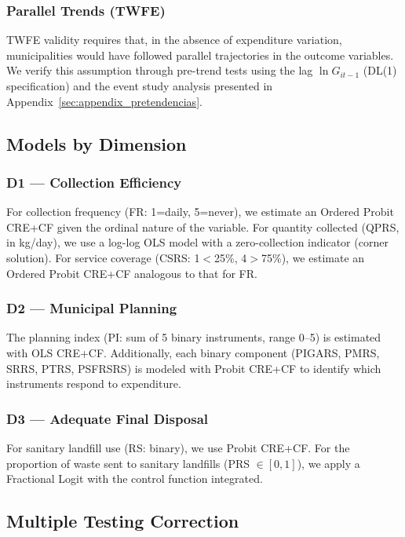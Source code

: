 \subsubsection*{Parallel Trends (TWFE)}

TWFE validity requires that, in the absence of expenditure variation, municipalities would have followed parallel trajectories in the outcome variables.
We verify this assumption through pre-trend tests using the lag $\ln G_{it-1}$ (DL(1) specification) and the event study analysis presented in Appendix~\cref{sec:appendix_pretendencias}.

\subsection{Models by Dimension}
\label{sec:modelos_dimension}

\subsubsection*{D1 --- Collection Efficiency}

For collection frequency (FR: 1=daily, 5=never), we estimate an Ordered Probit CRE+CF given the ordinal nature of the variable.
For quantity collected (QPRS, in kg/day), we use a log-log OLS model with a zero-collection indicator (corner solution).
For service coverage (CSRS: 1$<$25\%, 4$>$75\%), we estimate an Ordered Probit CRE+CF analogous to that for FR.

\subsubsection*{D2 --- Municipal Planning}

The planning index (PI: sum of 5 binary instruments, range 0--5) is estimated with OLS CRE+CF.
Additionally, each binary component (PIGARS, PMRS, SRRS, PTRS, PSFRSRS) is modeled with Probit CRE+CF to identify which instruments respond to expenditure.

\subsubsection*{D3 --- Adequate Final Disposal}

For sanitary landfill use (RS: binary), we use Probit CRE+CF.
For the proportion of waste sent to sanitary landfills (PRS $\in [0,1]$), we apply a Fractional Logit \citep{PapkeWooldridge1996} with the control function integrated.

\subsection{Multiple Testing Correction}
\label{sec:bonferroni}

